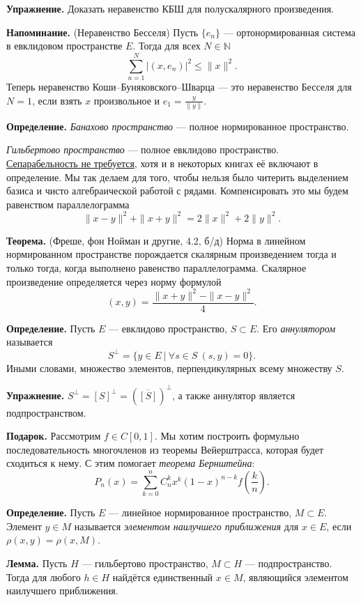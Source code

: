 \textbf{Упражнение.} Доказать неравенство КБШ для полускалярного произведения.

\textbf{Напоминание.} (Неравенство Бесселя) Пусть $\{e_n\}$ --- ортонормированная система в евклидовом пространстве $E$.
Тогда для всех $N \in \mathbb N$
\[
    \sum_{n=1}^{N} |(x, e_n)|^2 \le \|x\|^2.
\]
Теперь неравенство Коши--Буняковского--Шварца --- это неравенство Бесселя для $N = 1$, если взять $x$ произвольное и $e_1 = \frac{y}{\|y\|}$.

\textbf{Определение.} \textit{Банахово пространство} --- полное нормированное пространство.

\textit{Гильбертово пространство} --- полное евклидово пространство. \\
\underline{Сепарабельность не требуется}, хотя и в некоторых книгах её включают в определение.
Мы так делаем для того, чтобы нельзя было читерить выделением базиса и чисто алгебраической работой с рядами.
Компенсировать это мы будем равенством параллелограмма
\[
    \|x - y\|^2 + \|x + y\|^2 = 2\|x\|^2 + 2\|y\|^2.
\]

\textbf{Теорема.} (Фреше, фон Нойман и другие, 4.2, б/д)
Норма в линейном нормированном пространстве порождается скалярным произведением тогда и только тогда, когда выполнено равенство параллелограмма.
Скалярное произведение определяется через норму формулой
\[
    (x, y) = \frac{\|x + y\|^2 - \|x - y\|^2}{4}.
\]

\textbf{Определение.} Пусть $E$ --- евклидово пространство, $S \subset E$.
Его \textit{аннулятором} называется 
\[
    S^\bot = \{y \in E~|~\forall s \in S~(s, y) = 0\}.
\]
Иными словами, множество элементов, перпендикулярных всему множеству $S$.

\textbf{Упражнение.} $S^\bot = [S]^\bot = \left(\overline{[S]} \right)^\bot$, а также аннулятор является подпространством.

\textbf{Подарок.} Рассмотрим $f \in C[0, 1]$. Мы хотим построить формульно последовательность многочленов из теоремы Вейерштрасса, которая будет сходиться к нему.
С этим помогает \textit{теорема Бернштейна}:
\[
    P_n(x) = \sum_{k=0}^{n} C_n^k x^k (1 - x)^{n-k} f \left( \frac{k}{n} \right).
\]

\textbf{Определение.} Пусть $E$ --- линейное нормированное пространство, $M \subset E$.
Элемент $y \in M$ называется \textit{элементом наилучшего приближения} для $x \in E$, если $\rho(x, y) = \rho(x, M)$.

\textbf{Лемма.} Пусть $H$ --- гильбертово пространство, $M \subset H$ --- подпространство.
Тогда для любого $h \in H$ найдётся единственный $x \in M$, являющийся элементом наилучшего приближения.

